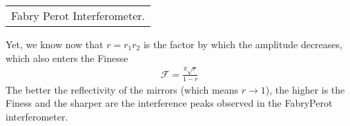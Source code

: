 \documentclass[letterpaper,10pt,english]{sphinxmanual}
\begin{document}
\begin{savenotes}\sphinxattablestart
\centering
\begin{tabulary}{\linewidth}[t]{|T|}
\hline
\sphinxstyletheadfamily 
{}
\\
\hline
{} Fabry Perot Interferometer.
\\
\hline
\end{tabulary}
\par
\sphinxattableend\end{savenotes}

Yet, we know now that \(r=r_1 r_2\) is the factor by which the amplitude decreases, which also enters the Finesse
\begin{equation*}
\begin{split}\mathcal{F}=\frac{\pi \sqrt{r}}{1-r}\end{split}
\end{equation*}
The better the reflectivity of the mirrors (which means \(r\rightarrow 1\)), the higher is the Finess and the sharper are the interference peaks observed in the Fabry\sphinxhyphen{}Perot interferometer.
\end{document}
